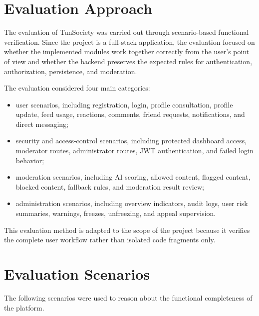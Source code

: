 \section{Evaluation Approach}

The evaluation of TunSociety was carried out through scenario-based functional verification. Since the project is a full-stack application, the evaluation focused on whether the implemented modules work together correctly from the user's point of view and whether the backend preserves the expected rules for authentication, authorization, persistence, and moderation.

The evaluation considered four main categories:

\begin{itemize}
    \item user scenarios, including registration, login, profile consultation, profile update, feed usage, reactions, comments, friend requests, notifications, and direct messaging;
    \item security and access-control scenarios, including protected dashboard access, moderator routes, administrator routes, JWT authentication, and failed login behavior;
    \item moderation scenarios, including AI scoring, allowed content, flagged content, blocked content, fallback rules, and moderation result review;
    \item administration scenarios, including overview indicators, audit logs, user risk summaries, warnings, freezes, unfreezing, and appeal supervision.
\end{itemize}

This evaluation method is adapted to the scope of the project because it verifies the complete user workflow rather than isolated code fragments only.

\section{Evaluation Scenarios}

The following scenarios were used to reason about the functional completeness of the platform.

